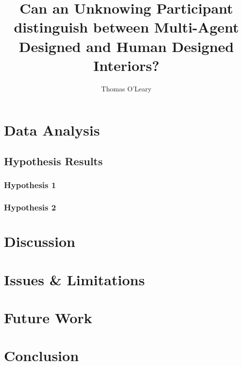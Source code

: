 \documentclass[journal]{IEEEtran}
\begin{document}
\title{Can an Unknowing Participant distinguish between Multi-Agent Designed and Human Designed Interiors?}

\author{Thomas O'Leary}

\maketitle









%



\section{Data Analysis}
\subsection{Hypothesis Results}
\subsubsection{Hypothesis 1}
\subsubsection{Hypothesis 2}

\section{Discussion}

\section{Issues \& Limitations}

\section{Future Work}

\section{Conclusion}





\end{document}
